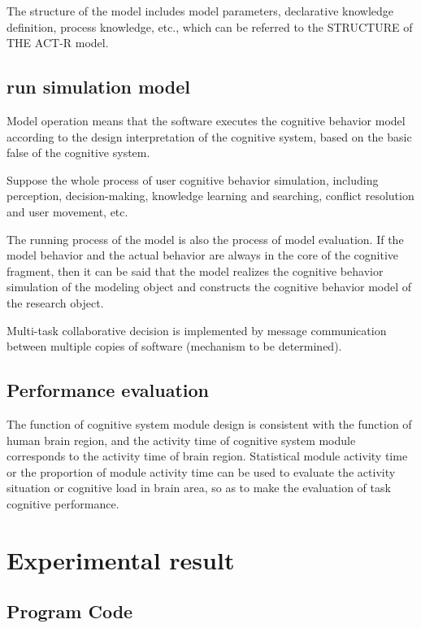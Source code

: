 \documentclass[twoside,11pt]{article}
\begin{document}
The structure of the model includes model parameters, declarative knowledge definition, process knowledge, etc., which can be referred to the STRUCTURE of THE ACT-R model.


\subsection{run simulation model}


Model operation means that the software executes the cognitive behavior model according to the design interpretation of the cognitive system, based on the basic false of the cognitive system.


Suppose the whole process of user cognitive behavior simulation, including perception, decision-making, knowledge learning and searching, conflict resolution and user movement, etc.


The running process of the model is also the process of model evaluation. If the model behavior and the actual behavior are always in the core of the cognitive fragment, then it can be said that the model realizes the cognitive behavior simulation of the modeling object and constructs the cognitive behavior model of the research object.


Multi-task collaborative decision is implemented by message communication between multiple copies of software (mechanism to be determined).


\subsection{Performance evaluation}


The function of cognitive system module design is consistent with the function of human brain region, and the activity time of cognitive system module corresponds to the activity time of brain region. Statistical module activity time or the proportion of module activity time can be used to evaluate the activity situation or cognitive load in brain area, so as to make the evaluation of task cognitive performance.


\section{Experimental result}
\label{rt}


\subsection{Program Code}
\end{document}
